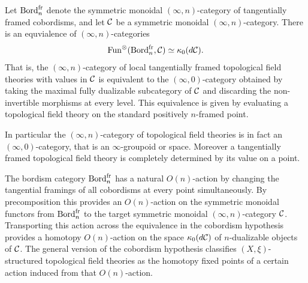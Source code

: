 \documentclass{amsart}
\begin{document}
\begin{theorem}
	Let $\mathrm{Bord}^\mathrm{fr}_n$ denote the symmetric monoidal $(\infty,n)$-category of tangentially framed cobordisms, and let $\mathcal C$ be a symmetric monoidal $(\infty,n)$-category.  There is an equvialence of $(\infty,n)$-categories
	\begin{equation*}
		\operatorname{Fun}^\otimes(\mathrm{Bord}^\mathrm{fr}_n, \mathcal C) \simeq \kappa_0 (d\mathcal C).
	\end{equation*} 
	That is, the $(\infty,n)$-category of local tangentially framed topological field theories with values in $\mathcal C$ is equivalent to the $(\infty,0)$-category obtained by taking the maximal fully dualizable subcategory of $\mathcal C$ and discarding the non-invertible morphisms at every level. This equivalence is given by evaluating a topological field theory on the standard positively $n$-framed point. 
\end{theorem}

\noindent In particular the $(\infty,n)$-category of topological field theories is in fact an $(\infty,0)$-category, that is an $\infty$-groupoid or space. Moreover a tangentially framed topological field theory is completely determined by its value on a point. 

The bordism category $\mathrm{Bord}^\mathrm{fr}_n$ has a natural $O(n)$-action by changing the tangential framings of all cobordisms at every point simultaneously.  By precomposition this provides an $O(n)$-action on the symmetric monoidal functors from $\mathrm{Bord}^\mathrm{fr}_n$ to the target symmetric monoidal $(\infty,n)$-category $\mathcal C$.  Transporting this action across the equivalence in the cobordism hypothesis provides a homotopy $O(n)$-action on the space $\kappa_0(d\mathcal C)$ of $n$-dualizable objects of $\mathcal C$.  The general version of the cobordism hypothesis classifies $(X,\xi)$-structured topological field theories as the homotopy fixed points of a certain action induced from that $O(n)$-action.

\end{document}
